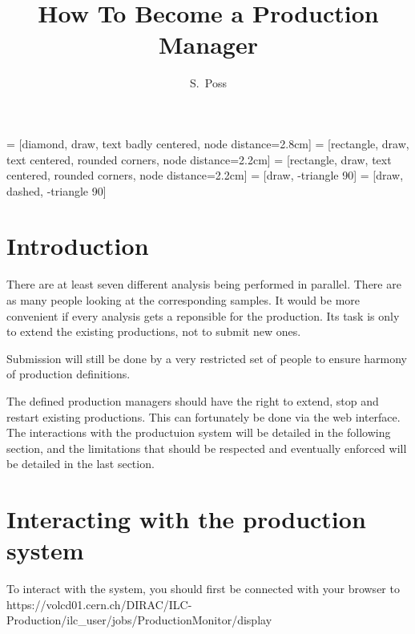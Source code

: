 \documentclass[a4paper,12pt]{article}
\title{How To Become a Production Manager}
\author{S.~Poss}
\begin{document}
 = [diamond, draw, text badly centered, node distance=2.8cm]
 = [rectangle, draw, text centered, rounded corners, node distance=2.2cm]
 = [rectangle, draw, text centered, rounded corners, node distance=2.2cm]
 = [draw, -triangle 90]
 = [draw, dashed, -triangle 90]

\maketitle
{}

\tableofcontents

\section{Introduction}
There are at least seven different analysis being performed in parallel. There
are as many people looking at the corresponding samples. It would be more
convenient if every analysis gets a reponsible for the production. Its task is
only to extend the existing productions, not to submit new ones. 

Submission will
still be done by a very restricted set of people to ensure harmony of
production definitions. 

The defined production managers should have the right to extend, stop and
restart existing productions. This can fortunately be done  via the web
interface. The interactions with the productuion system will be detailed in the
following section, and the limitations that should be respected and eventually
enforced will be detailed in the last section.

\section{Interacting with the production system}
To interact with the system, you should first be connected with your browser
to\\
https://volcd01.cern.ch/DIRAC/ILC-Production/ilc\_user/jobs/ProductionMonitor/display
\end{document}
